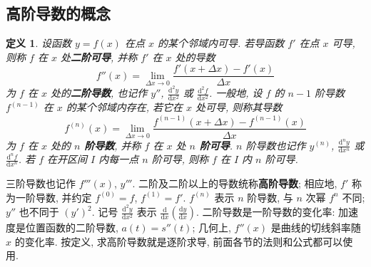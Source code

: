 \documentclass[UTF8,openany]{ctexbook}
\theoremstyle{chinesetextbook}
\newtheorem*{definitionsingle}{定义}
\newcommand{\dd}{\mathrm d}
\begin{document}
\subsection{高阶导数的概念}
\begin{definitionsingle}
设函数 $y=f(x)$ 在点 $x$ 的某个邻域内可导. 若导函数 $f'$ 在点 $x$ 可导, 则称 $f$ 在 $x$ 处\textbf{二阶可导}, 并称 $f'$ 在 $x$ 处的导数
\[
f''(x)=\lim_{\Delta x\to0}\frac{f'(x+\Delta x)-f'(x)}{\Delta x}
\]
为 $f$ 在 $x$ 处的\textbf{二阶导数}, 也记作 $y''$, $\displaystyle\frac{\dd^2y}{\dd x^2}$ 或 $\displaystyle\frac{\dd^2f}{\dd x^2}$. 一般地, 设 $f$ 的 $n-1$ 阶导数 $f^{(n-1)}$ 在 $x$ 的某个邻域内存在, 若它在 $x$ 处可导, 则称其导数
\[
f^{(n)}(x)=\lim_{\Delta x\to0}\frac{f^{(n-1)}(x+\Delta x)-f^{(n-1)}(x)}{\Delta x}
\]
为 $f$ 在 $x$ 处的 \textbf{$n$ 阶导数}, 并称 $f$ 在 $x$ 处 \textbf{$n$ 阶可导}. $n$ 阶导数也记作 $y^{(n)}$, $\displaystyle\frac{\dd^ny}{\dd x^n}$ 或 $\displaystyle\frac{\dd^nf}{\dd x^n}$. 若 $f$ 在开区间 $I$ 内每一点 $n$ 阶可导, 则称 $f$ 在 $I$ 内 $n$ 阶可导.
\end{definitionsingle}
三阶导数也记作 $f'''(x)$, $y'''$. 二阶及二阶以上的导数统称\textbf{高阶导数}; 相应地, $f'$ 称为一阶导数, 并约定 $f^{(0)}=f$, $f^{(1)}=f'$. $f^{(n)}$ 表示 $n$ 阶导数, 与 $n$ 次幂 $f^n$ 不同; $y''$ 也不同于 $(y')^2$. 记号 $\displaystyle\frac{\dd^2y}{\dd x^2}$ 表示 $\displaystyle\frac{\dd}{\dd x}\left(\frac{\dd y}{\dd x}\right)$. 二阶导数是一阶导数的变化率: 加速度是位置函数的二阶导数, $a(t)=s''(t)$; 几何上, $f''(x)$ 是曲线的切线斜率随 $x$ 的变化率. 按定义, 求高阶导数就是逐阶求导, 前面各节的法则和公式都可以使用.
\end{document}
